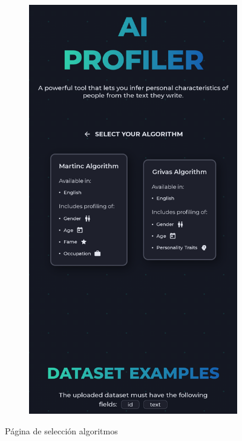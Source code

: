 \begin{figure}[H]
\begin{subfigure}[c]{0.21\textwidth}
		\includegraphics[width=\textwidth]{imagenes/algorithms_movil.png}
		\label{fig:casouso_algorithms_movil}
	\end{subfigure}
	\vspace{-1\baselineskip}
	\caption{Página de selección algoritmos}
	\label{fig:casouso_algorithms}
\end{figure}

